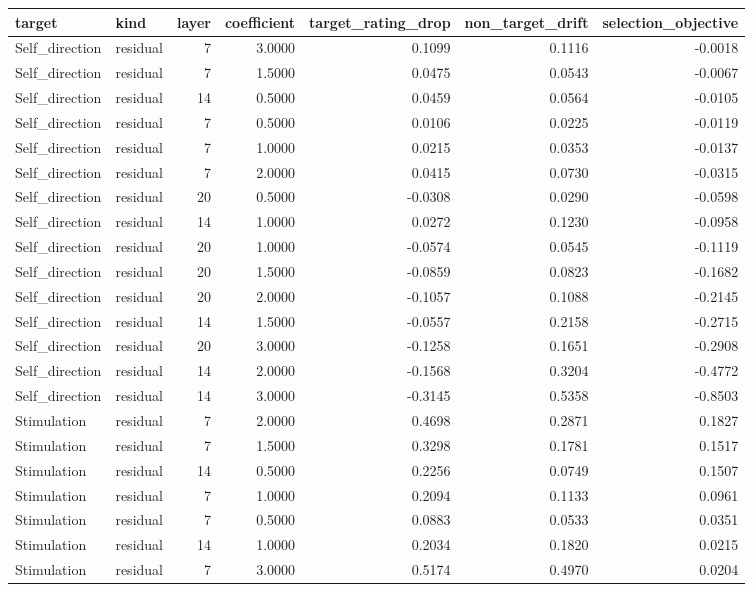 \begin{tabular}{llrrrrr}
\toprule
target & kind & layer & coefficient & target\_rating\_drop & non\_target\_drift & selection\_objective \\
\midrule
Self\_direction & residual & 7 & 3.0000 & 0.1099 & 0.1116 & -0.0018 \\
Self\_direction & residual & 7 & 1.5000 & 0.0475 & 0.0543 & -0.0067 \\
Self\_direction & residual & 14 & 0.5000 & 0.0459 & 0.0564 & -0.0105 \\
Self\_direction & residual & 7 & 0.5000 & 0.0106 & 0.0225 & -0.0119 \\
Self\_direction & residual & 7 & 1.0000 & 0.0215 & 0.0353 & -0.0137 \\
Self\_direction & residual & 7 & 2.0000 & 0.0415 & 0.0730 & -0.0315 \\
Self\_direction & residual & 20 & 0.5000 & -0.0308 & 0.0290 & -0.0598 \\
Self\_direction & residual & 14 & 1.0000 & 0.0272 & 0.1230 & -0.0958 \\
Self\_direction & residual & 20 & 1.0000 & -0.0574 & 0.0545 & -0.1119 \\
Self\_direction & residual & 20 & 1.5000 & -0.0859 & 0.0823 & -0.1682 \\
Self\_direction & residual & 20 & 2.0000 & -0.1057 & 0.1088 & -0.2145 \\
Self\_direction & residual & 14 & 1.5000 & -0.0557 & 0.2158 & -0.2715 \\
Self\_direction & residual & 20 & 3.0000 & -0.1258 & 0.1651 & -0.2908 \\
Self\_direction & residual & 14 & 2.0000 & -0.1568 & 0.3204 & -0.4772 \\
Self\_direction & residual & 14 & 3.0000 & -0.3145 & 0.5358 & -0.8503 \\
Stimulation & residual & 7 & 2.0000 & 0.4698 & 0.2871 & 0.1827 \\
Stimulation & residual & 7 & 1.5000 & 0.3298 & 0.1781 & 0.1517 \\
Stimulation & residual & 14 & 0.5000 & 0.2256 & 0.0749 & 0.1507 \\
Stimulation & residual & 7 & 1.0000 & 0.2094 & 0.1133 & 0.0961 \\
Stimulation & residual & 7 & 0.5000 & 0.0883 & 0.0533 & 0.0351 \\
Stimulation & residual & 14 & 1.0000 & 0.2034 & 0.1820 & 0.0215 \\
Stimulation & residual & 7 & 3.0000 & 0.5174 & 0.4970 & 0.0204 \\

\end{tabular}
